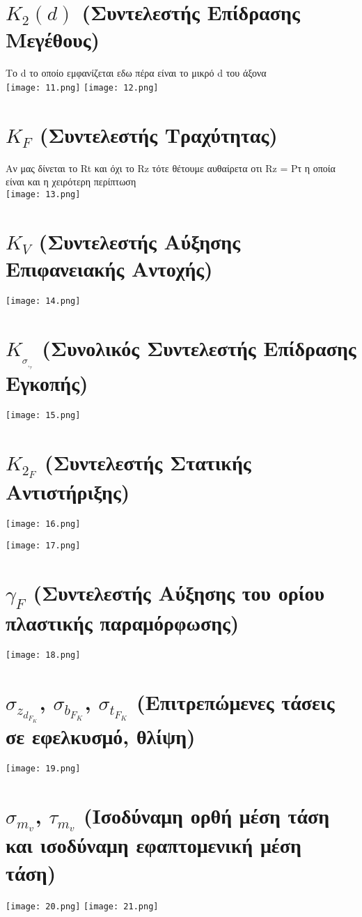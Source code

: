 \documentclass{article}
\begin{document}
\section{\textbf{\huge $K_2(d)$}  (Συντελεστής Επίδρασης Μεγέθους) }
Το d το οποίο εμφανίζεται εδω πέρα είναι το μικρό d του άξονα 
\\
\texttt{[image: 11.png]}
\texttt{[image: 12.png]}  
\section{\textbf{\huge $K_F$ }  (Συντελεστής Τραχύτητας) }
 Αν μας δίνεται το Rt και όχι το Rz τότε θέτουμε αυθαίρετα οτι Rz = Ρτ η οποία είναι και η χειρότερη περίπτωση 
 \\
\texttt{[image: 13.png]}
\section{\textbf{\huge $K_V$ }  (Συντελεστής Αύξησης Επιφανειακής Αντοχής) }
\texttt{[image: 14.png]}
\section{\textbf{\huge $K__σ_,_τ$}   (Συνολικός Συντελεστής Επίδρασης Εγκοπής) }
\texttt{[image: 15.png]}
\section{\textbf{\huge $K_2_F$ }    (Συντελεστής Στατικής Αντιστήριξης) }
\texttt{[image: 16.png]}

\texttt{[image: 17.png]}
\section{\textbf{\huge $γ_F$}    (Συντελεστής Αύξησης του ορίου πλαστικής παραμόρφωσης) }
\texttt{[image: 18.png]}
\section{\textbf{\huge $σ_z_d_F_K$, $σ_b_F_K$, $σ_t_F_K$}    (Επιτρεπώμενες τάσεις σε εφελκυσμό, θλίψη) }
\texttt{[image: 19.png]}
\section{\textbf{\huge $σ_m_v$,  $τ_m_v$ }       (Ισοδύναμη ορθή μέση τάση και ισοδύναμη εφαπτομενική μέση τάση)  }
\texttt{[image: 20.png]}
\texttt{[image: 21.png]}
\end{document}
